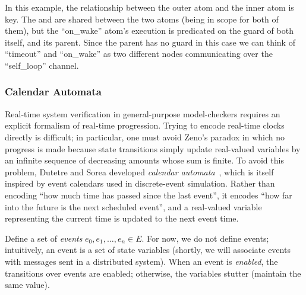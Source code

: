 
In this example, the relationship between the
outer atom and the inner atom is key. The  and  are shared between
the two atoms (being in scope for both of them), but the ``on\_wake'' atom's
execution is predicated on the guard of both itself, and its parent. Since
the parent has no guard in this case we can think of ``timeout'' and
``on\_wake'' as two different nodes communicating over the ``self\_loop''
channel.





\subsubsection{Calendar Automata}\label{ssec:calendar}

Real-time system verification in general-purpose model-checkers
requires an explicit formalism of real-time progression. Trying to
encode real-time clocks directly is difficult; in particular, one
must avoid Zeno's paradox in which no progress is made because state
transitions simply update real-valued variables by an infinite
sequence of decreasing amounts whose sum is finite. To avoid this
problem, Dutetre and Sorea developed \emph{calendar
automata}~\cite{Dutertre-Sorea-2004}, which is itself inspired by
event calendars used in discrete-event simulation. Rather than
encoding ``how much time has passed since the last event'', it
encodes ``how far into the future is the next scheduled event'',
and a real-valued variable representing the current time is updated
to the next event time.

Define a set of \emph{events} $e_0, e_1, \ldots, e_n \in E$. For now, we
do not define events; intuitively, an event is a set of state variables
(shortly, we will associate events with messages sent in a distributed
system). When an event is \emph{enabled}, the transitions over events
are enabled; otherwise, the variables stutter (maintain the same value).

